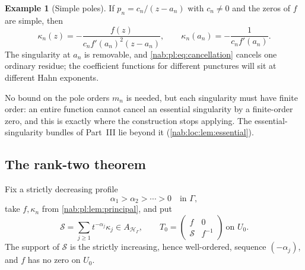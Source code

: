 \documentclass[11pt,letterpaper]{article}
\theoremstyle{definition}
\newtheorem{example}[example]{Example}
\theoremstyle{remark}
\newcommand{\HH}{\mathscr H_\Gamma}
\numberwithin{equation}{section}
\begin{document}
\begin{example}[Simple poles]\label{nab:pl:ex:simple}
If $p_n=c_n/(z-a_n)$ with $c_n\neq0$ and the zeros of $f$ are simple, then
\begin{equation}\label{nab:pl:eq:simplekappa}
 \kappa_n(z)=-\frac{f(z)}{c_nf'(a_n)^2(z-a_n)},\qquad
 \kappa_n(a_n)=-\frac1{c_nf'(a_n)} .
\end{equation}
The singularity at $a_n$ is removable, and \eqref{nab:pl:eq:cancellation}
cancels one ordinary residue; the coefficient functions for different
punctures will sit at different Hahn exponents.
\end{example}

No bound on the pole orders $m_n$ is needed, but each singularity must have
finite order: an entire function cannot cancel an essential singularity by a
finite-order zero, and this is exactly where the construction stops applying.
The essential-singularity bundles of Part~III lie beyond it
(\cref{nab:loc:lem:essential}).

\subsection{The rank-two theorem}

Fix a strictly decreasing profile
\begin{equation}\label{nab:pl:eq:profile}
 \alpha_1>\alpha_2>\cdots>0\quad\text{in }\Gamma,
\end{equation}
take $f,\kappa_n$ from \cref{nab:pl:lem:principal}, and put
\begin{equation}\label{nab:pl:eq:S}
 \mathcal S=\sum_{j\geq1}t^{-\alpha_j}\kappa_j\in A_{\HH},\qquad
 T_0=\begin{pmatrix}f&0\\ \mathcal S&f^{-1}\end{pmatrix}\ \text{on }U_0 .
\end{equation}
The support of $\mathcal S$ is the strictly increasing, hence well-ordered,
sequence $(-\alpha_j)$, and $f$ has no zero on $U_0$.
\end{document}

